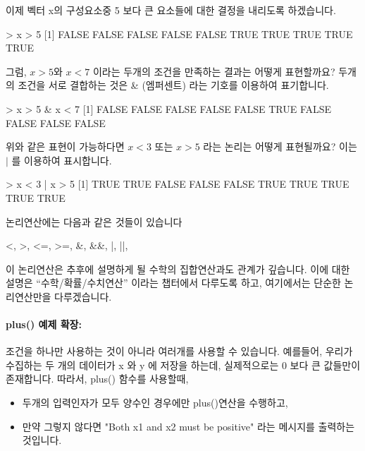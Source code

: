 이제 벡터 x의 구성요소중 5 보다 큰 요소들에 대한 결정을 내리도록 하겠습니다. 

\begin{Schunk}
\begin{Soutput}
> x > 5
 [1] FALSE FALSE FALSE FALSE FALSE  TRUE  TRUE  TRUE  TRUE  TRUE
\end{Soutput}
\end{Schunk}

그럼, $x>5$와  $x<7$ 이라는 두개의 조건을 만족하는 결과는 어떻게 표현할까요?
두개의 조건을 서로 결합하는 것은 \& (엠퍼센트) 라는 기호를 이용하여 표기합니다. 
 
\begin{Schunk}
\begin{Soutput}
> x > 5 & x < 7
 [1] FALSE FALSE FALSE FALSE FALSE  TRUE FALSE FALSE FALSE FALSE
\end{Soutput}
\end{Schunk}

위와 같은 표현이 가능하다면 $x<3$ 또는 $x>5$ 라는 논리는 어떻게 표현될까요? 
이는 $|$ 를 이용하여 표시합니다. 

\begin{Schunk}
\begin{Soutput}
> x < 3 | x > 5
 [1]  TRUE  TRUE FALSE FALSE FALSE  TRUE  TRUE  TRUE  TRUE  TRUE
\end{Soutput}
\end{Schunk}

논리연산에는 다음과 같은 것들이 있습니다
\begin{Schunk}
\begin{Soutput}
<, >, <=, >=, &, &&, |, ||, 
\end{Soutput}
\end{Schunk}

이 논리연산은 추후에 설명하게 될 수학의 집합연산과도 관계가 깊습니다. 
이에 대한 설명은 ``수학/확률/수치연산'' 이라는 챕터에서 다루도록 하고, 여기에서는 단순한 논리연산만을 다루겠습니다. 



\paragraph{plus() 예제 확장: }

조건을 하나만 사용하는 것이 아니라 여러개를 사용할 수 있습니다. 
예를들어, 우리가 수집하는 두 개의 데이터가 x 와  y 에 저장을 하는데, 실제적으로는 0 보다 큰 값들만이 존재합니다. 
따라서, plus() 함수를 사용할때,  

\begin{itemize}
\item 두개의 입력인자가 모두 양수인 경우에만 plus()연산을 수행하고,
\item 만약 그렇지 않다면 "Both x1 and x2 must be positive" 라는 메시지를 출력하는 것입니다.
\end{itemize}

